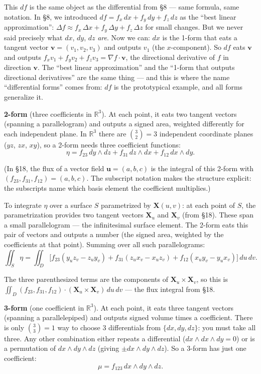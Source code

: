 \documentclass[11pt]{report}
\newcommand{\R}{\mathbb{R}}
\begin{document}
This $df$ is the same object as the differential from \S8 --- same formula, same notation. In \S8, we introduced $df = f_x\,dx + f_y\,dy + f_z\,dz$ as the ``best linear approximation'': $\Delta f \approx f_x\,\Delta x + f_y\,\Delta y + f_z\,\Delta z$ for small changes. But we never said precisely what $dx$, $dy$, $dz$ \textit{are}. Now we can: $dx$ is the 1-form that eats a tangent vector $\mathbf{v} = (v_1, v_2, v_3)$ and outputs $v_1$ (the $x$-component). So $df$ eats $\mathbf{v}$ and outputs $f_x v_1 + f_y v_2 + f_z v_3 = \nabla f \cdot \mathbf{v}$, the directional derivative of $f$ in direction $\mathbf{v}$. The ``best linear approximation'' and the ``1-form that outputs directional derivatives'' are the same thing --- and this is where the name ``differential forms'' comes from: $df$ is the prototypical example, and all forms generalize it.

\textbf{2-form} (three coefficients in $\R^3$). At each point, it eats two tangent vectors (spanning a parallelogram) and outputs a signed area, weighted differently for each independent plane. In $\R^3$ there are $\binom{3}{2} = 3$ independent coordinate planes ($yz$, $zx$, $xy$), so a 2-form needs three coefficient functions:
\[
\eta = f_{23}\,dy \wedge dz + f_{31}\,dz \wedge dx + f_{12}\,dx \wedge dy.
\]

(In \S18, the flux of a vector field $\mathbf{u} = (a, b, c)$ is the integral of this 2-form with $(f_{23}, f_{31}, f_{12}) = (a, b, c)$. The subscript notation makes the structure explicit: the subscripts name which basis element the coefficient multiplies.)

To integrate $\eta$ over a surface $S$ parametrized by $\mathbf{X}(u,v)$: at each point of $S$, the parametrization provides two tangent vectors $\mathbf{X}_u$ and $\mathbf{X}_v$ (from \S18). These span a small parallelogram --- the infinitesimal surface element. The 2-form eats this pair of vectors and outputs a number (the signed area, weighted by the coefficients at that point). Summing over all such parallelograms:
\[
\iint_S \eta = \iint_D \big[ f_{23}(y_u z_v - z_u y_v) + f_{31}(z_u x_v - x_u z_v) + f_{12}(x_u y_v - y_u x_v) \big] \, du \, dv.
\]

The three parenthesized terms are the components of $\mathbf{X}_u \times \mathbf{X}_v$, so this is $\iint_D (f_{23}, f_{31}, f_{12}) \cdot (\mathbf{X}_u \times \mathbf{X}_v) \, du\,dv$ --- the flux integral from \S18.

\textbf{3-form} (one coefficient in $\R^3$). At each point, it eats three tangent vectors (spanning a parallelepiped) and outputs signed volume times a coefficient. There is only $\binom{3}{3} = 1$ way to choose 3 differentials from $\{dx, dy, dz\}$: you must take all three. Any other combination either repeats a differential ($dx \wedge dx \wedge dy = 0$) or is a permutation of $dx \wedge dy \wedge dz$ (giving $\pm dx \wedge dy \wedge dz$). So a 3-form has just one coefficient:
\[
\mu = f_{123}\,dx \wedge dy \wedge dz.
\]
\end{document}
